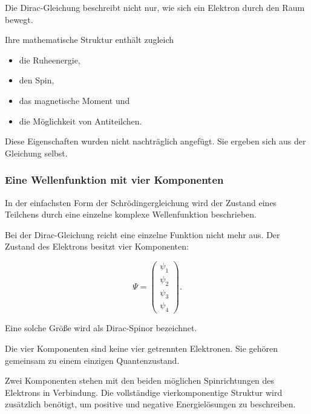 \begin{DidacticBox}
	\label{box:mehr_als_bewegungsgleichung_dirac}
	
	Die Dirac-Gleichung beschreibt nicht nur, wie sich ein Elektron durch
	den Raum bewegt.
	
	Ihre mathematische Struktur enthält zugleich
	
	\begin{itemize}
		\item die Ruheenergie,
		\item den Spin,
		\item das magnetische Moment und
		\item die Möglichkeit von Antiteilchen.
	\end{itemize}
	
	Diese Eigenschaften wurden nicht nachträglich angefügt. Sie ergeben
	sich aus der Gleichung selbst.
\end{DidacticBox}

\subsubsection*{Eine Wellenfunktion mit vier Komponenten}

In der einfachsten Form der Schrödingergleichung wird der Zustand eines
Teilchens durch eine einzelne komplexe Wellenfunktion beschrieben.

Bei der Dirac-Gleichung reicht eine einzelne Funktion nicht mehr aus.
Der Zustand des Elektrons besitzt vier Komponenten:

\begin{equation}
	\Psi
	=
	\begin{pmatrix}
		\psi_1 \\
		\psi_2 \\
		\psi_3 \\
		\psi_4
	\end{pmatrix}.
	\label{eq:vierkomponentiger_dirac_spinor_kapitel07}
\end{equation}

Eine solche Größe wird als Dirac-Spinor%
 bezeichnet.

Die vier Komponenten sind keine vier getrennten Elektronen. Sie
gehören gemeinsam zu einem einzigen Quantenzustand.

Zwei Komponenten stehen mit den beiden möglichen Spinrichtungen des
Elektrons in Verbindung. Die vollständige vierkomponentige Struktur
wird zusätzlich benötigt, um positive und negative Energielösungen zu
beschreiben.

